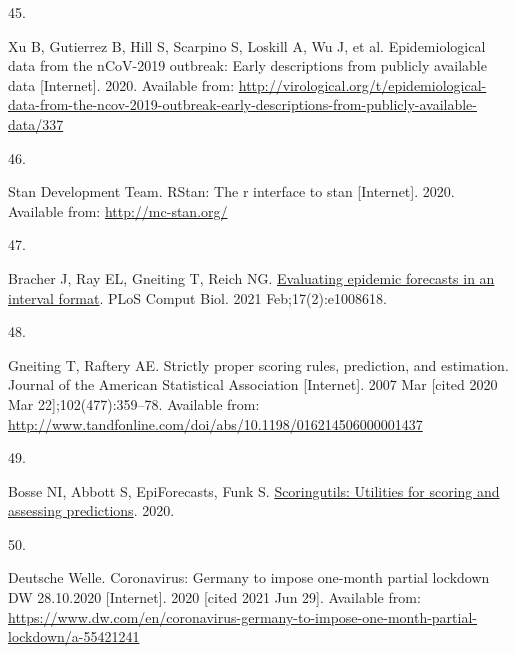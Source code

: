 \documentclass[
]{article}
\newlength{\cslhangindent}
\newlength{\csllabelwidth}
\newlength{\cslentryspacingunit} %
\newenvironment{CSLReferences}[2] %
 {%
  \setlength{\parindent}{0pt}
  \ifodd #1
  \let\oldpar\par
  \def\par{\hangindent=\cslhangindent\oldpar}
  \fi
  \setlength{\parskip}{#2\cslentryspacingunit}
 }%
 {}
\newcommand{\CSLLeftMargin}[1]{\parbox[t]{\csllabelwidth}{#1}}
\newcommand{\CSLRightInline}[1]{\parbox[t]{\linewidth - \csllabelwidth}{#1}\break}
\providecommand{\DIFaddbegin}{} %
\providecommand{\DIFaddend}{} %
\providecommand{\DIFdelbegin}{} %
\providecommand{\DIFdelend}{} %
\newcommand{\DIFscaledelfig}{0.5}
\newlength{\DIFdelgraphicswidth} %
\newlength{\DIFdelgraphicsheight} %
\newcommand{\DIFaddincludegraphics}[2][]{{\color{blue}\fbox{\DIFOincludegraphics[#1]{#2}}}} %
\newcommand{\DIFdelincludegraphics}[2][]{%
\sbox{\DIFdelgraphicsbox}{\DIFOincludegraphics[#1]{#2}}%
\settoboxwidth{\DIFdelgraphicswidth}{\DIFdelgraphicsbox} %
\settoboxtotalheight{\DIFdelgraphicsheight}{\DIFdelgraphicsbox} %
\scalebox{\DIFscaledelfig}{%
\parbox[b]{\DIFdelgraphicswidth}{\usebox{\DIFdelgraphicsbox}\\[-\baselineskip] \rule{\DIFdelgraphicswidth}{0em}}\llap{\resizebox{\DIFdelgraphicswidth}{\DIFdelgraphicsheight}{%
\setlength{\unitlength}{\DIFdelgraphicswidth}%
\begin{picture}(1,1)%
\thicklines\linethickness{2pt} %
{\color[rgb]{1,0,0}\put(0,0){\framebox(1,1){}}}%
{\color[rgb]{1,0,0}\put(0,0){\line( 1,1){1}}}%
{\color[rgb]{1,0,0}\put(0,1){\line(1,-1){1}}}%
\end{picture}%
}\hspace*{3pt}}} %
} %
\DeclareRobustCommand{\DIFaddbegin}{\DIFOaddbegin \let\includegraphics\DIFaddincludegraphics} %
\DeclareRobustCommand{\DIFaddend}{\DIFOaddend \let\includegraphics\DIFOincludegraphics} %
\DeclareRobustCommand{\DIFdelbegin}{\DIFOdelbegin \let\includegraphics\DIFdelincludegraphics} %
\DeclareRobustCommand{\DIFdelend}{\DIFOaddend \let\includegraphics\DIFOincludegraphics} %
\begin{document}
\begin{CSLReferences}{0}{0}
\leavevmode{}%
\CSLLeftMargin{45. }
\CSLRightInline{Xu B, Gutierrez B, Hill S, Scarpino S, Loskill A, Wu J, et al. Epidemiological data from the nCoV-2019 outbreak: Early descriptions from publicly available data {[}Internet{]}. 2020. Available from: \url{http://virological.org/t/epidemiological-data-from-the-ncov-2019-outbreak-early-descriptions-from-publicly-available-data/337}}

\leavevmode{}%
\CSLLeftMargin{46. }
\CSLRightInline{Stan Development Team. RStan: The r interface to stan {[}Internet{]}. 2020. Available from: \url{http://mc-stan.org/}}

\leavevmode{}%
\CSLLeftMargin{47. }
\DIFdelbegin %
\DIFdelend \DIFaddbegin \CSLRightInline{Bracher J, Ray EL, Gneiting T, Reich NG. \href{https://doi.org/10.1371/journal.pcbi.1008618}{Evaluating epidemic forecasts in an interval format}. PLoS Comput Biol. 2021 Feb;17(2):e1008618. }
\DIFaddend 

\leavevmode{}%
\CSLLeftMargin{48. }
\CSLRightInline{Gneiting T, Raftery AE. Strictly proper scoring rules, prediction, and estimation. Journal of the American Statistical Association {[}Internet{]}. 2007 Mar {[}cited 2020 Mar 22{]};102(477):359--78. Available from: \url{http://www.tandfonline.com/doi/abs/10.1198/016214506000001437}}

\leavevmode{}%
\CSLLeftMargin{49. }
\DIFdelbegin %
\DIFdelend \DIFaddbegin \CSLRightInline{Bosse NI, Abbott S, EpiForecasts, Funk S. \href{https://doi.org/10.5281/zenodo.4618017}{Scoringutils: Utilities for scoring and assessing predictions}. 2020. }
\DIFaddend 

\leavevmode{}%
\CSLLeftMargin{50. }
\CSLRightInline{Deutsche Welle. Coronavirus: {Germany} to impose one-month partial lockdown \textbar{} {DW} \textbar{} 28.10.2020 {[}Internet{]}. 2020 {[}cited 2021 Jun 29{]}. Available from: \url{https://www.dw.com/en/coronavirus-germany-to-impose-one-month-partial-lockdown/a-55421241}}


\end{CSLReferences}
\end{document}
